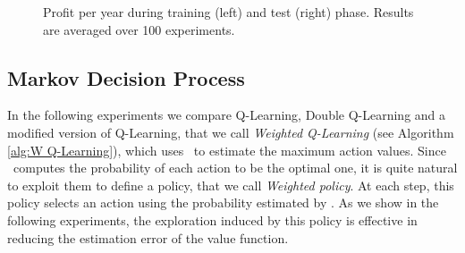 \begin{figure*}[t]
    \begin{minipage}{\textwidth}
    \centering 
    \setlength\figureheight{4.5cm}
    \setlength\figurewidth{7cm}
    \caption{Profit per year during training (left) and test (right) phase. Results are averaged over 100 experiments.}\label{F:forex}
    \end{minipage}
\end{figure*}


\subsection{Markov Decision Process}
In the following experiments we compare Q-Learning, Double Q-Learning and a modified version of Q-Learning, that we call \textit{Weighted Q-Learning} (see Algorithm \ref{alg:W Q-Learning}), which uses \WE~to estimate the maximum action values.
Since \WE~computes the probability of each action to be the optimal one, it is quite natural to exploit them to define a policy, that we call \textit{Weighted policy}. 
At each step, this policy selects an action using the probability estimated by \WE. As we show in the following experiments, the exploration induced by this policy is effective in reducing the estimation error of the value function.


